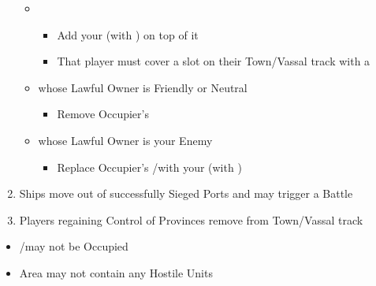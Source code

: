 \documentclass[10pt]{article}
\begin{document}
\begin{enumerate}
\begin{itemize}
\begin{itemize}
		\end{itemize}
		\item {}
		\begin{itemize}
			\item Add your \town (with \unrest) on top of it
			\item That player must cover a slot on their Town/Vassal track with a \cube
		\end{itemize}
		\item {} whose Lawful Owner is Friendly or Neutral
		\begin{itemize}
			\item Remove Occupier's \town
		\end{itemize}
		\item {} whose Lawful Owner is your Enemy
		\begin{itemize}
			\item Replace Occupier's \town/\rebeltown with your \town (with \unrest)
		\end{itemize}
	\end{itemize}
	\item Ships move out of successfully Sieged Ports and may trigger a Battle
	\item Players regaining Control of Provinces remove \cubes from Town/Vassal track
\end{enumerate}

\begin{itemize}
	\item \town/\vassal may not be Occupied
	\item Area may not contain any Hostile Units
\end{itemize}
\end{document}
